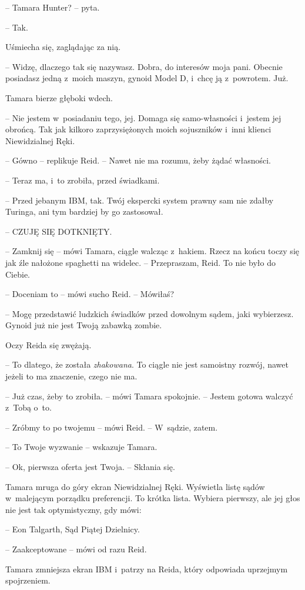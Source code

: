 \documentclass[oneside,polish,11pt,sfheadings]{mwbk}
\begin{document}
-- Tamara Hunter? -- pyta.

-- Tak.

Uśmiecha się, zaglądając za nią.

-- Widzę, dlaczego tak się nazywasz. Dobra, do interesów moja pani.
Obecnie posiadasz jedną z~moich maszyn, gynoid Model D, i~chcę ją z~powrotem. Już.

Tamara bierze głęboki wdech.

-- Nie jestem w~posiadaniu tego, jej. Domaga się samo-własności i~jestem
jej obrońcą. Tak jak kilkoro zaprzysiężonych moich sojuszników i~inni
klienci Niewidzialnej Ręki.

-- Gówno -- replikuje Reid. -- Nawet nie ma rozumu, żeby żądać własności.

-- Teraz ma, i~to zrobiła, przed świadkami.

-- Przed jebanym IBM, tak. Twój ekspercki system prawny sam nie zdałby
Turinga, ani tym bardziej by go zastosował.

-- CZUJĘ SIĘ DOTKNIĘTY.

-- Zamknij się -- mówi Tamara, ciągle walcząc z~hakiem. Rzecz na końcu
toczy się jak źle nałożone spaghetti na widelec. -- Przepraszam, Reid. To
nie było do Ciebie.

-- Doceniam to -- mówi sucho Reid. -- Mówiłaś?

-- Mogę przedstawić ludzkich świadków przed dowolnym sądem, jaki
wybierzesz. Gynoid już nie jest Twoją zabawką zombie.

Oczy Reida się zwężają. 

-- To dlatego, że została \emph{zhakowana}. To
ciągle nie jest samoistny rozwój, nawet jeżeli to ma znaczenie, czego
nie ma.

-- Już czas, żeby to zrobiła. -- mówi Tamara spokojnie. -- Jestem gotowa
walczyć z~Tobą o~to.

-- Zróbmy to po twojemu -- mówi Reid. -- W~sądzie, zatem.

-- To Twoje wyzwanie -- wskazuje Tamara.

-- Ok, pierwsza oferta jest Twoja. -- Skłania się.

Tamara mruga do góry ekran Niewidzialnej Ręki. Wyświetla listę sądów w~malejącym porządku preferencji. To krótka lista. Wybiera pierwszy, ale
jej głos nie jest tak optymistyczny, gdy mówi: 

-- Eon Talgarth, Sąd
Piątej Dzielnicy.

-- Zaakceptowane -- mówi od razu Reid.

Tamara zmniejsza ekran IBM i~patrzy na Reida, który odpowiada uprzejmym
spojrzeniem.
\end{document}
